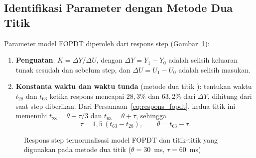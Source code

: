 \documentclass[11pt,a4paper]{article}
\begin{document}
\subsection{Identifikasi Parameter dengan Metode Dua Titik}
Parameter model FOPDT diperoleh dari respons step (Gambar~\ref{fig:dua_titik}):
\begin{enumerate}
	\item \textbf{Penguatan}: $K = \Delta Y / \Delta U$, dengan $\Delta Y = Y_1 - Y_0$ adalah selisih keluaran tunak sesudah dan sebelum step, dan $\Delta U = U_1 - U_0$ adalah selisih masukan.
	\item \textbf{Konstanta waktu dan waktu tunda} (metode dua titik \cite{seborg}): tentukan waktu $t_{28}$ dan $t_{63}$ ketika respons mencapai $28{,}3\%$ dan $63{,}2\%$ dari $\Delta Y$, dihitung dari saat step diberikan. Dari Persamaan~\eqref{eq:respons_fopdt}, kedua titik ini memenuhi $t_{28} = \theta + \tau/3$ dan $t_{63} = \theta + \tau$, sehingga
	      \begin{equation}
		      \tau = 1{,}5\,(t_{63} - t_{28}), \qquad \theta = t_{63} - \tau.
		      \label{eq:dua_titik}
	      \end{equation}
\end{enumerate}

\begin{figure}[H]
	\centering
	\caption{Respons step ternormalisasi model FOPDT dan titik-titik yang digunakan pada metode dua titik ($\theta = 30$~ms, $\tau = 60$~ms)}
	\label{fig:dua_titik}
\end{figure}
\end{document}
